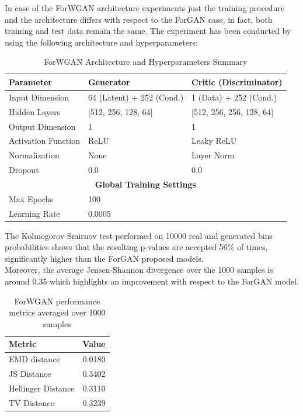 In case of the ForWGAN architecture experiments 
just the training procedure and the architecture differs with respect to the ForGAN case, 
in fact, both training and test data remain the same.
The experiment has been conducted by using the following architecture and hyperparameters:
\begin{table}[H]
\centering
\caption{ForWGAN Architecture and Hyperparameters Summary}
\label{tab:forwgan_summary}
\begin{tabular}{lll}
\hline
\textbf{Parameter}         & \textbf{Generator}          & \textbf{Critic (Discriminator)} \\ \hline
Input Dimension            & 64 (Latent) + 252 (Cond.)   & 1 (Data) + 252 (Cond.)          \\
Hidden Layers              & [512, 256, 128, 64]         & [512, 256, 256, 128, 64]        \\
Output Dimension           & 1                           & 1                               \\
Activation Function        & ReLU                        & Leaky ReLU                      \\
Normalization              & None                        & Layer Norm                      \\
Dropout                    & 0.0                         & 0.0                             \\
\multicolumn{3}{c}{\textbf{Global Training Settings}}                                     \\ \hline
Max Epochs                 & \multicolumn{2}{l}{100}                                       \\
Learning Rate              & \multicolumn{2}{l}{0.0005}                                      \\
\end{tabular}
\end{table}


The Kolmogorov-Smirnov test performed on 10000 real and generated bins probabilities shows that
the resulting p-values are accepted 56\% of times, significantly higher than the ForGAN proposed models.\\
Moreover, the average Jensen-Shannon divergence over the 1000 samples is around 0.35 which highlights an improvement with respect to the ForGAN model.\\
\begin{table}[h]
\centering
\begin{tabular}{l c}
\hline
\textbf{Metric} & \textbf{Value} \\
\hline
EMD distance & 0.0180 \\
JS Distance & 0.3402 \\
Hellinger Distance & 0.3110 \\
TV Distance & 0.3239 \\
\hline
\end{tabular}
\caption{ForWGAN performance metrics averaged over 1000 samples}
\end{table}


